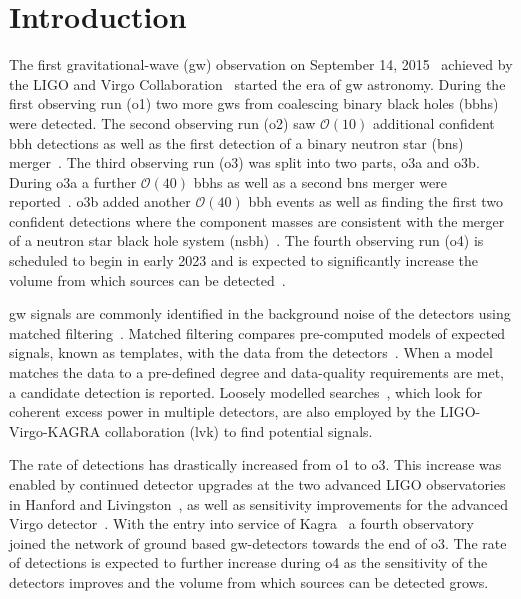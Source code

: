 \section{Introduction}
The first gravitational-wave (\acrshort{gw}) observation on September 14, 2015~\cite{LIGOScientific:2016aoc} achieved by the LIGO and Virgo Collaboration~\cite{LIGOScientific:2014pky, VIRGO:2014yos} started the era of \acrshort{gw} astronomy. During the first observing run (\acrshort{o1}) two more \acrshort{gw}s from coalescing binary black holes (\acrshort{bbh}s) were detected. The second observing run (\acrshort{o2}) saw $\mathcal{O}(10)$ additional confident \acrshort{bbh} detections as well as the first detection of a binary neutron star (\acrshort{bns}) merger~\cite{LIGOScientific:2017vwq, LIGOScientific:2018mvr, Nitz:2018imz, Nitz:2020oeq, Venumadhav:2019tad, Venumadhav:2019lyq}. The third observing run (\acrshort{o3}) was split into two parts, \acrshort{o3a} and \acrshort{o3b}. During \acrshort{o3a} a further $\mathcal{O}(40)$ \acrshort{bbh}s as well as a second \acrshort{bns} merger were reported~\cite{LIGOScientific:2020ibl, LIGOScientific:2021usb, Nitz:2021uxj}. \acrshort{o3b} added another $\mathcal{O}(40)$ \acrshort{bbh} events as well as finding the first two confident detections where the component masses are consistent with the merger of a neutron star black hole system (\acrshort{nsbh})~\cite{LIGOScientific:2021djp, Nitz:2021zwj}. The fourth observing run (\acrshort{o4}) is scheduled to begin in early 2023 and is expected to significantly increase the volume from which sources can be detected~\cite{KAGRA:2013rdx, Cahillane:2022pqm}.

\acrshort{gw} signals are commonly identified in the background noise of the detectors using matched filtering~\cite{LIGOScientific:2021djp, Messick:2016aqy, DalCanton:2020vpm, Adams:2015ulm}. Matched filtering compares pre-computed models of expected signals, known as templates, with the data from the detectors~\cite{Allen:2005fk}. When a model matches the data to a pre-defined degree and data-quality requirements are met, a candidate detection is reported.
Loosely modelled searches~\cite{Klimenko:2005xv, Klimenko:2015ypf, Lynch:2015yin}, which look for coherent excess power in multiple detectors, are also employed by the LIGO-Virgo-KAGRA collaboration (\acrshort{lvk}) to find potential signals.

The rate of detections has drastically increased from \acrshort{o1} to \acrshort{o3}. This increase was enabled by continued detector upgrades at the two advanced LIGO observatories in Hanford and Livingston~\cite{LIGOScientific:2014pky}, as well as sensitivity improvements for the advanced Virgo detector~\cite{VIRGO:2014yos}. With the entry into service of Kagra~\cite{KAGRA:2018plz} a fourth observatory joined the network of ground based \acrshort{gw}-detectors towards the end of \acrshort{o3}. The rate of detections is expected to further increase during \acrshort{o4} as the sensitivity of the detectors improves and the volume from which sources can be detected grows.

